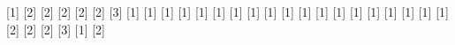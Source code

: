 \newtextcommand{\partial}
\newtextcommand{\qed}
\newtextcommand{\mod}
\newtextcommand{\pmod}[1]
\newtextcommand{\bottom}
\newtextcommand{\neg}
\newtextcommand{\neq}
\newtextcommand{\ne}
\newtextcommand{\shortmid}
\newtextcommand{\mid}
\newtextcommand{\int}
\newtextcommand{\integral}
\newtextcommand{\iint}
\newtextcommand{\doubleintegral}
\newtextcommand{\iiint}
\newtextcommand{\tripleintegral}
\newtextcommand{\iiiint}
\newtextcommand{\quadrupleintegral}
\newtextcommand{\oint}
\newtextcommand{\conint}
\newtextcommand{\contourintegral}
\newtextcommand{\times}
\newtextcommand{\star}
\newtextcommand{\circleddash}
\newtextcommand{\odash}
\newtextcommand{\intercal}
\newtextcommand{\smallfrown}
\newtextcommand{\smallsmile}
\newtextcommand{\boxminus}
\newtextcommand{\minusb}
\newtextcommand{\boxplus}
\newtextcommand{\plusb}
\newtextcommand{\boxtimes}
\newtextcommand{\timesb}
\newtextcommand{\sum}
\newtextcommand{\prod}
\newtextcommand{\product}
\newtextcommand{\coprod}
\newtextcommand{\coproduct}
\newtextcommand{\otimes}
\newtextcommand{\Otimes}
\newtextcommand{\bigotimes}
\newtextcommand{\ominus}
\newtextcommand{\oslash}
\newtextcommand{\oplus}
\newtextcommand{\Oplus}
\newtextcommand{\bigoplus}
\newtextcommand{\bigodot}
\newtextcommand{\bigsqcap}
\newtextcommand{\bigsqcup}
\newtextcommand{\biguplus}
\newtextcommand{\biginterleave}
\newtextcommand{\wedge}
\newtextcommand{\Wedge}
\newtextcommand{\bigwedge}
\newtextcommand{\Vee}
\newtextcommand{\bigvee}
\newtextcommand{\invamp}
\newtextcommand{\parr}
\newtextcommand{\frac}[2]
\newtextcommand{\tfrac}[2]
\newtextcommand{\binom}[2]
\newtextcommand{\tbinom}[2]
\newtextcommand{\tensor}[2]
\newtextcommand{\multiscripts}[3]
\newtextcommand{\overbrace}[1]
\newtextcommand{\underbrace}[1]
\newtextcommand{\underline}[1]
\newtextcommand{\bar}[1]
\newtextcommand{\overline}[1]
\newtextcommand{\closure}[1]
\newtextcommand{\widebar}[1]
\newtextcommand{\vec}[1]
\newtextcommand{\widevec}[1]
\newtextcommand{\dot}[1]
\newtextcommand{\ddot}[1]
\newtextcommand{\dddot}[1]
\newtextcommand{\ddddot}[1]
\newtextcommand{\tilde}[1]
\newtextcommand{\widetilde}[1]
\newtextcommand{\check}[1]
\newtextcommand{\widecheck}[1]
\newtextcommand{\hat}[1]
\newtextcommand{\widehat}[1]
\newtextcommand{\underset}[2]
\newtextcommand{\stackrel}[2]
\newtextcommand{\overset}[2]
\newtextcommand{\over}
\newtextcommand{\atop}
\newtextcommand{\underoverset}[3]
\newtextcommand{\sqrt}[1]
\newtextcommand{\root}[2]
\newtextcommand{\statusline}
\newtextcommand{\tooltip}
\newtextcommand{\toggle}
\newtextcommand{\fghilight}
\newtextcommand{\fghighlight}

